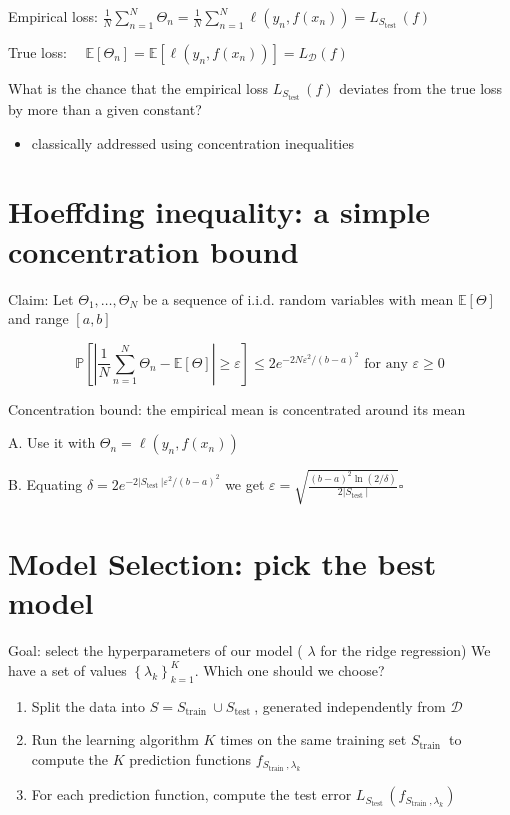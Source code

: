 Empirical loss: $\frac{1}{N} \sum_{n=1}^{N} \Theta_{n}=\frac{1}{N} \sum_{n=1}^{N} \ell\left(y_{n}, f\left(x_{n}\right)\right)=L_{S_{\text {test }}}(f)$

True loss: $\quad \mathbb{E}\left[\Theta_{n}\right]=\mathbb{E}\left[\ell\left(y_{n}, f\left(x_{n}\right)\right)\right]=L_{\mathscr{D}}(f)$

What is the chance that the empirical loss $L_{S_{\text {test }}}(f)$ deviates from the true loss by more than a given constant?

\begin{itemize}
  \item classically addressed using concentration inequalities
\end{itemize}

\section*{Hoeffding inequality: a simple concentration bound}
Claim: Let $\Theta_{1}, \ldots, \Theta_{N}$ be a sequence of i.i.d. random variables with mean $\mathbb{E}[\Theta]$ and range $[a, b]$

$$
\mathbb{P}\left[\left|\frac{1}{N} \sum_{n=1}^{N} \Theta_{n}-\mathbb{E}[\Theta]\right| \geq \varepsilon\right] \leq 2 e^{-2 N \varepsilon^{2} /(b-a)^{2}} \text { for any } \varepsilon \geq 0
$$

Concentration bound: the empirical mean is concentrated around its mean

A. Use it with $\Theta_{n}=\ell\left(y_{n}, f\left(x_{n}\right)\right)$

B. Equating $\delta=2 e^{-2\left|S_{\text {test }}\right| \varepsilon^{2} /(b-a)^{2}}$ we get $\varepsilon=\sqrt{\frac{(b-a)^{2} \ln (2 / \delta)}{2\left|S_{\text {test }}\right|}} \square$

\section*{Model Selection: pick the best model}
Goal: select the hyperparameters of our model ( $\lambda$ for the ridge regression) We have a set of values $\left\{\lambda_{k}\right\}_{k=1}^{K}$. Which one should we choose?

\begin{enumerate}
  \item Split the data into $S=S_{\text {train }} \cup S_{\text {test }}$, generated independently from $\mathscr{D}$

  \item Run the learning algorithm $K$ times on the same training set $S_{\text {train }}$ to compute the $K$ prediction functions $f_{S_{\text {train }}, \lambda_{k}}$

  \item For each prediction function, compute the test error $L_{S_{\text {test }}}\left(f_{S_{\text {train }}, \lambda_{k}}\right)$

\end{enumerate}

